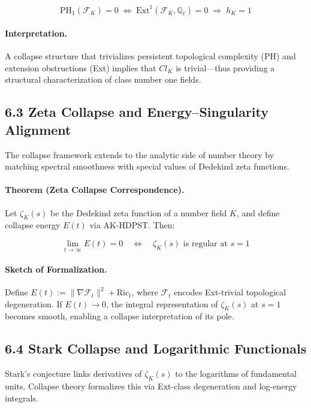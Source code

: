 \documentclass[11pt]{article}
\begin{document}
\[
\mathrm{PH}_1(\mathcal{F}_K) = 0 \;\Leftrightarrow\; \mathrm{Ext}^1(\mathcal{F}_K, \mathbb{Q}_\ell) = 0 \;\Rightarrow\; h_K = 1
\]

\paragraph{Interpretation.}
A collapse structure that trivializes persistent topological complexity (PH) and extension obstructions (Ext) implies that \( Cl_K \) is trivial—thus providing a structural characterization of class number one fields.

\subsection*{6.3 Zeta Collapse and Energy–Singularity Alignment}

The collapse framework extends to the analytic side of number theory by matching spectral smoothness with special values of Dedekind zeta functions.

\paragraph{Theorem (Zeta Collapse Correspondence).}
Let \( \zeta_K(s) \) be the Dedekind zeta function of a number field \( K \), and define collapse energy \( E(t) \) via AK-HDPST. Then:

\[
\lim_{t \to \infty} E(t) = 0 \quad \Leftrightarrow \quad \zeta_K(s) \text{ is regular at } s = 1
\]

\paragraph{Sketch of Formalization.}
Define \( E(t) := \|\nabla \mathcal{F}_t\|^2 + \text{Ric}_t \), where \( \mathcal{F}_t \) encodes Ext-trivial topological degeneration.
If \( E(t) \to 0 \), the integral representation of \( \zeta_K(s) \) at \( s = 1 \) becomes smooth, enabling a collapse interpretation of its pole.

\subsection*{6.4 Stark Collapse and Logarithmic Functionals}

Stark's conjecture links derivatives of \( \zeta_K(s) \) to the logarithms of fundamental units.
Collapse theory formalizes this via Ext-class degeneration and log-energy integrals.
\end{document}
